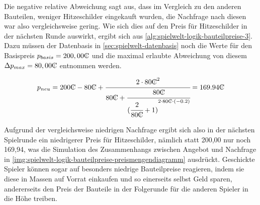 Die negative relative Abweichung sagt aus, dass im Vergleich zu den anderen Bauteilen, weniger Hitzeschilder eingekauft wurden, die Nachfrage nach diesen war also vergleichsweise gering. Wie sich dies auf den Preis für Hitzeschilder in der nächsten Runde auswirkt, ergibt sich aus \ref{alg:spielwelt-logik-bauteilpreise-3}. Dazu müssen der Datenbasis in \ref{sec:spielwelt-datenbasis} noch die Werte für den Basispreis $p_{basis} = 200,00\tc$ und die maximal erlaubte Abweichung von diesem $\Delta{}p_{max} = 80,00\tc$ entnommen werden.

\begin{large}
\begin{equation}
p_{neu} = 200 \tc -80 \tc + \cfrac{2 \cdot 80 \tc^2}{80 \tc + \cfrac{80 \tc}{({\cfrac{2}{80 \tc} + 1)}^{2 \cdot 80 \tc \cdot (-0.2)}}} = 169.94 \tc \nonumber
\end{equation}
\end{large}

Aufgrund der vergleichsweise niedrigen Nachfrage ergibt sich also in der nächsten Spielrunde ein niedrigerer Preis für Hitzeschilder, nämlich statt 200,00\curr{} nur noch 169,94\curr{}, was die Simulation des Zusammenhangs zwischen Angebot und Nachfrage in \ref{img:spielwelt-logik-bauteilpreise-preismengendiagramm} ausdrückt. Geschickte Spieler können sogar auf besonders niedrige Bauteilpreise reagieren, indem sie diese in Massen auf Vorrat einkaufen und so einerseits selbst Geld sparen, andererseits den Preis der Bauteile in der Folgerunde für die anderen Spieler in die Höhe treiben.